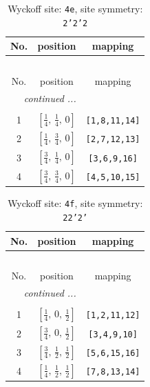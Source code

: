\documentclass[fleqn,8pt]{jsarticle}
\begin{document}
\renewcommand{\arraystretch}{1.2}
\begin{longtable}{ccc}
\caption{Wyckoff site: {\tt 4e}, site symmetry: {\tt 2'2'2}}
 \\
 \hline \hline
No. & position & mapping \\ \hline \endfirsthead

\multicolumn{2}{l}{\tablename\ \thetable{}} \\
 \hline \hline
No. & position & mapping \\ \hline \endhead

 \hline \hline
\multicolumn{2}{r}{\footnotesize\it continued ...} \\ \endfoot

 \hline \hline
\multicolumn{2}{r}{} \\ \endlastfoot

1 & $\left[ \frac{1}{4},\, \frac{1}{4},\, 0 \right]$ & {\tt [1,8,11,14]} \\ \hline
2 & $\left[ \frac{1}{4},\, \frac{3}{4},\, 0 \right]$ & {\tt [2,7,12,13]} \\ \hline
3 & $\left[ \frac{3}{4},\, \frac{1}{4},\, 0 \right]$ & {\tt [3,6,9,16]} \\ \hline
4 & $\left[ \frac{3}{4},\, \frac{3}{4},\, 0 \right]$ & {\tt [4,5,10,15]} \\
\end{longtable}
\renewcommand{\arraystretch}{1.2}
\begin{longtable}{ccc}
\caption{Wyckoff site: {\tt 4f}, site symmetry: {\tt 22'2'}}
 \\
 \hline \hline
No. & position & mapping \\ \hline \endfirsthead

\multicolumn{2}{l}{\tablename\ \thetable{}} \\
 \hline \hline
No. & position & mapping \\ \hline \endhead

 \hline \hline
\multicolumn{2}{r}{\footnotesize\it continued ...} \\ \endfoot

 \hline \hline
\multicolumn{2}{r}{} \\ \endlastfoot

1 & $\left[ \frac{1}{4},\, 0,\, \frac{1}{2} \right]$ & {\tt [1,2,11,12]} \\ \hline
2 & $\left[ \frac{3}{4},\, 0,\, \frac{1}{2} \right]$ & {\tt [3,4,9,10]} \\ \hline
3 & $\left[ \frac{3}{4},\, \frac{1}{2},\, \frac{1}{2} \right]$ & {\tt [5,6,15,16]} \\ \hline
4 & $\left[ \frac{1}{4},\, \frac{1}{2},\, \frac{1}{2} \right]$ & {\tt [7,8,13,14]} \\
\end{longtable}
\end{document}
